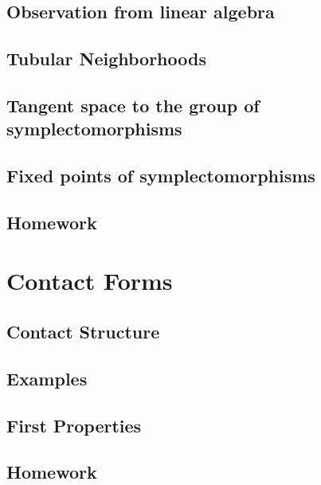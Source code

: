\documentclass[4paper]{article}
\begin{document}
\subsection{Observation from linear algebra}

\subsection{Tubular Neighborhoods}

\subsection{Tangent space to the group of symplectomorphisms}

\subsection{Fixed points of symplectomorphisms}

\subsection{Homework}

\section{Contact Forms}

\subsection{Contact Structure}

\subsection{Examples}

\subsection{First Properties}

\subsection{Homework}
\end{document}
